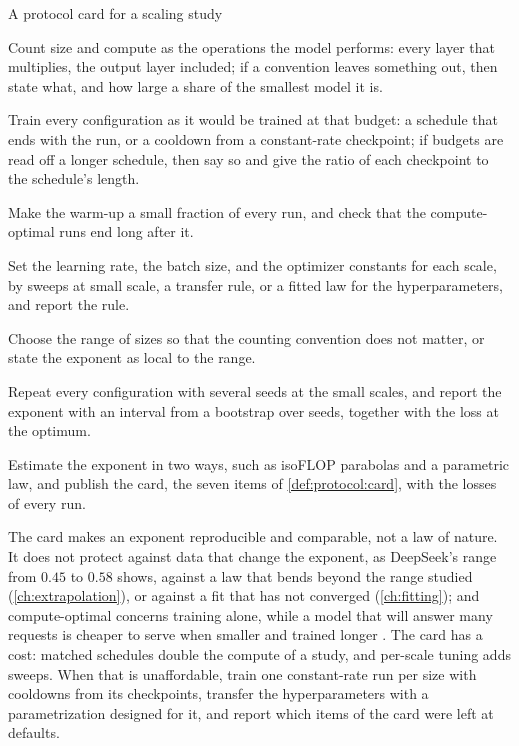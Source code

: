 \begin{refsection}
\begin{protocol}{A protocol card for a scaling study}\label{prot:protocol:card}
\item Count size and compute as the operations the model performs: every layer that multiplies, the output layer included; if a convention leaves something out, then state what, and how large a share of the smallest model it is.
\item Train every configuration as it would be trained at that budget: a schedule that ends with the run, or a cooldown from a constant-rate checkpoint; if budgets are read off a longer schedule, then say so and give the ratio of each checkpoint to the schedule's length.
\item Make the warm-up a small fraction of every run, and check that the compute-optimal runs end long after it.
\item Set the learning rate, the batch size, and the optimizer constants for each scale, by sweeps at small scale, a transfer rule, or a fitted law for the hyperparameters, and report the rule.
\item Choose the range of sizes so that the counting convention does not matter, or state the exponent as local to the range.
\item Repeat every configuration with several seeds at the small scales, and report the exponent with an interval from a bootstrap over seeds, together with the loss at the optimum.
\item Estimate the exponent in two ways, such as isoFLOP parabolas and a parametric law, and publish the card, the seven items of \cref{def:protocol:card}, with the losses of every run.
\end{protocol}

The card makes an exponent reproducible and comparable, not a law of nature. It does not protect against data that change the exponent, as DeepSeek's range from $0.45$ to $0.58$ shows, against a law that bends beyond the range studied (\cref{ch:extrapolation}), or against a fit that has not converged (\cref{ch:fitting}); and compute-optimal concerns training alone, while a model that will answer many requests is cheaper to serve when smaller and trained longer \parencite{SardanaEtAl2024}. The card has a cost: matched schedules double the compute of a study, and per-scale tuning adds sweeps. When that is unaffordable, train one constant-rate run per size with cooldowns from its checkpoints, transfer the hyperparameters with a parametrization designed for it, and report which items of the card were left at defaults.


\end{refsection}
